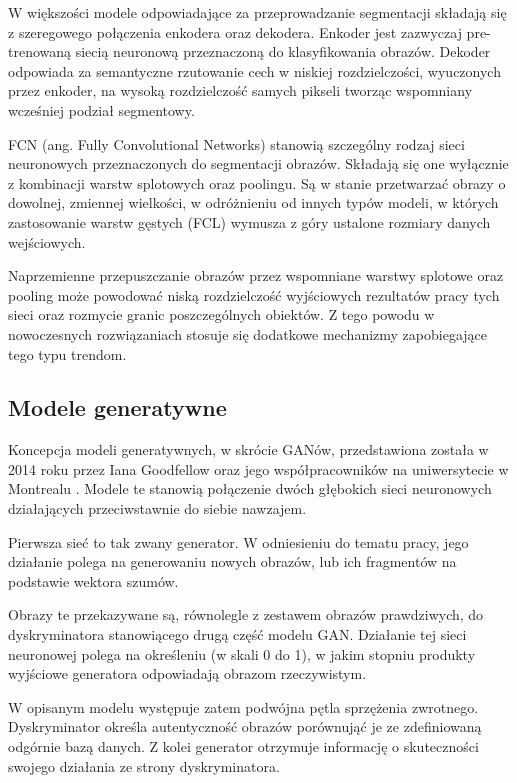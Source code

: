    W większości modele odpowiadające za przeprowadzanie segmentacji składają się z szeregowego połączenia enkodera oraz dekodera. Enkoder jest zazwyczaj pre-trenowaną siecią neuronową przeznaczoną do klasyfikowania obrazów. Dekoder odpowiada za semantyczne rzutowanie cech w niskiej rozdzielczości, wyuczonych przez enkoder, na wysoką rozdzielczość samych pikseli tworząc wspomniany wcześniej podział segmentowy.

   FCN (ang. Fully Convolutional Networks) stanowią szczególny rodzaj sieci neuronowych przeznaczonych do segmentacji obrazów. Składają się one wyłącznie z kombinacji warstw splotowych oraz poolingu. Są w stanie przetwarzać obrazy o dowolnej, zmiennej wielkości, w odróżnieniu od innych typów modeli, w których zastosowanie warstw gęstych (FCL) wymusza z góry ustalone rozmiary danych wejściowych.

   Naprzemienne przepuszczanie obrazów przez wspomniane warstwy splotowe oraz pooling może powodować niską rozdzielczość wyjściowych rezultatów pracy tych sieci oraz rozmycie granic poszczególnych obiektów. Z tego powodu w nowoczesnych rozwiązaniach stosuje się dodatkowe mechanizmy zapobiegające tego typu trendom.

  \subsection{Modele generatywne}
  \label{modele_generatywne}
   Koncepcja modeli generatywnych, w skrócie GANów, przedstawiona została w 2014 roku przez Iana Goodfellow oraz jego współpracowników na uniwersytecie w Montrealu \cite{gan}. Modele te stanowią połączenie dwóch głębokich sieci neuronowych działających przeciwstawnie do siebie nawzajem.

   Pierwsza sieć to tak zwany generator. W odniesieniu do tematu pracy, jego działanie polega na generowaniu nowych obrazów, lub ich fragmentów na podstawie wektora szumów.

   Obrazy te przekazywane są, równolegle z zestawem obrazów prawdziwych, do dyskryminatora stanowiącego drugą część modelu GAN. Działanie tej sieci neuronowej polega na określeniu (w skali 0 do 1), w jakim stopniu produkty wyjściowe generatora odpowiadają obrazom rzeczywistym.

   W opisanym modelu występuje zatem podwójna pętla sprzężenia zwrotnego. Dyskryminator określa autentyczność obrazów porównująć je ze zdefiniowaną odgórnie bazą danych. Z kolei generator otrzymuje informację o skuteczności swojego działania ze strony dyskryminatora.

